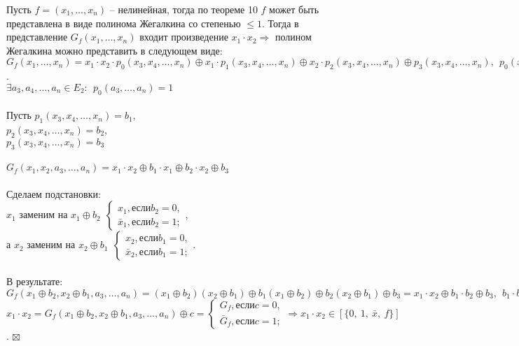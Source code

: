 \documentclass[a4paper, 12pt]{report}
\newenvironment{Proof} %
{\par\noindent{$\blacklozenge$}} %
{\hfill$\scriptstyle\boxtimes$} %
\begin{document}
\begin{Proof}
    Пусть $f = (x_1,\dotso,x_n)$ – нелинейная, тогда по теореме 10 $f$ может быть представлена в виде полинома Жегалкина со степенью $\leqslant 1$. Тогда в представление $G_f(x_1,\dotso ,x_n)$ входит произведение $x_1 \cdot x_2 \Rightarrow$ полином Жегалкина можно представить в следующем виде:\\
    $G_f(x_1,\dotso ,x_n) = x_1\cdot x_2 \cdot p_0(x_3, x_4,\dotso, x_n) \oplus x_1\cdot p_1(x_3, x_4,\dotso, x_n) \oplus x_2\cdot p_2(x_3, x_4,\dotso, x_n) \oplus p_3(x_3, x_4,\dotso, x_n),~~ p_0(x_3, x_4, \dotso, x_n)\not\equiv 0$.\\ 
    $\exists a_3, a_4, \dotso, a_n \in E_2: ~~ p_0(a_3, \dotso, a_n)=1$\\\\
	Пусть $p_1(x_3, x_4,\dotso, x_n)=b_1$,\\
               $p_2(x_3, x_4,\dotso, x_n)=b_2$,\\
            $p_3(x_3, x_4,\dotso, x_n)=b_3$\\\\
	$G_f(x_1, x_2, a_3,\dotso, a_n)=x_1\cdot x_2\oplus b_1\cdot x_1\oplus b_2\cdot x_2\oplus b_3$\\\\
	Сделаем подстановки:\\
 $x_1$ заменим на $x_1\oplus b_2 ~~ \begin{cases}
     x_1, \text{если} b_2 = 0,\\
     \bar x_1, \text{если} b_2 = 1;
 \end{cases}$,\\
 а $x_2$ заменим на $x_2\oplus b_1 ~~ \begin{cases}
     x_2, \text{если} b_1 = 0,\\
     \bar x_2, \text{если} b_1 = 1;
 \end{cases}$.\\ \\
 В результате:\\
	$G_f(x_1\oplus b_2, x_2\oplus b_1, a_3,\dotso, a_n)= (x_1\oplus b_2)( x_2\oplus b_1)\oplus b_ 1(x_1\oplus b_2)\oplus b_2(x_2\oplus b_1)\oplus b_3 = x_1\cdot x_2 \oplus b_1\cdot b_2\oplus b_3,~~ b_1\cdot b_2\oplus b_3 = c$\\
	$x_1\cdot x_2= G_f(x_1\oplus b_2, x_2\oplus b_1, a_3,\dotso, a_n) \oplus c = \begin{cases}
	    G_f, \text{если} c = 0,\\
     \bar G_f, \text{если} c = 1; 
	\end{cases} \Rightarrow x_1\cdot x_2 \in [\{0,~ 1,~ \bar x,~ f\}]$.
\end{Proof}\\\\
\end{document}
